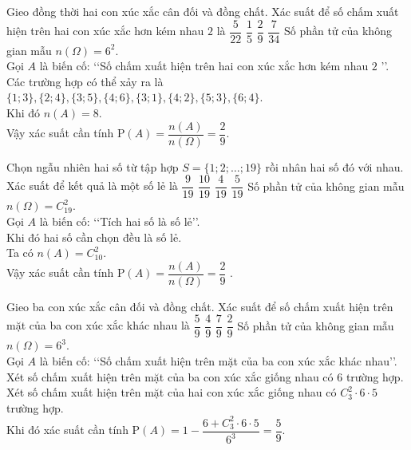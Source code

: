 \begin{ex}%
	Gieo đồng thời hai con xúc xắc cân đối và đồng chất. Xác suất để số chấm xuất hiện trên hai con xúc xắc hơn kém nhau $2$ là
	\choice
	{$\dfrac{5}{22}$}
	{$\dfrac{1}{5}$}
	{\True $\dfrac{2}{9}$}
	{$\dfrac{7}{34}$}
	\loigiai
	{
		Số phần tử của không gian mẫu $n(\Omega)=6^2$.\\
		Gọi  $A$ là biến cố: \lq\lq  Số chấm xuất hiện trên hai con xúc xắc hơn kém nhau $2$ \rq\rq.\\
		Các trường hợp có thể xảy ra là $\{1 ; 3\},\{2 ; 4\},\{3 ; 5\},\{4 ; 6\},\{3 ; 1\},\{4 ; 2\},\{5 ; 3\},\{6 ; 4\}$.\\
		Khi đó $n(A)=8$.\\
		Vậy xác suất cần tính $ \mathrm{P}(A)=\dfrac{n(A)}{n(\Omega)}=\dfrac{2}{9}$.		
	}	
\end{ex}
\begin{ex}%
	Chọn ngẫu nhiên hai số từ tập hợp $S=\{1 ; 2 ; \ldots ; 19\}$ rồi nhân hai số đó với nhau. Xác suất để kết quả là một số lẻ là
	\choice
	{$\dfrac{9}{19}$}
	{$\dfrac{10}{19}$}
	{$\dfrac{4}{19}$}
	{\True $\dfrac{5}{19}$}
	\loigiai
	{
		Số phần tử của không gian mẫu $n(\Omega)=C_{19}^{2}$.\\
		Gọi $A$ là biến cố: \lq\lq  Tích hai số là số lẻ\rq\rq.\\
		Khi đó hai số cần chọn đều là số lẻ.\\
		Ta có $n(A)=C_{10}^{2}$.\\
		Vậy xác suất cần tính $ \mathrm{P}(A)=\dfrac{n(A)}{n(\Omega)}=\dfrac{2}{9}$ 	.	
	}	
\end{ex}
\begin{ex}%
	Gieo ba con xúc xắc cân đối và đồng chất. Xác suất để số chấm xuất hiện trên mặt của ba con xúc xắc khác nhau là
	\choice
	{\True $\dfrac{5}{9}$}
	{$\dfrac{4}{9}$}
	{$\dfrac{7}{9}$}
	{$\dfrac{2}{9}$}
	\loigiai
	{
		Số phần tử của không gian mẫu $n(\Omega)=6^3$.\\
		Gọi  $A$ là biến cố: \lq\lq  Số chấm xuất hiện trên mặt của ba con xúc xắc khác nhau\rq\rq.\\
		Xét số chấm xuất hiện trên mặt của ba con xúc xắc giống nhau có $6$ trường hợp.\\
		Xét số chấm xuất hiện trên mặt của hai con xúc xắc giống nhau có $C_{3}^{2}\cdot 6\cdot 5$ trường hợp.\\
		Khi đó xác suất cần tính $ \mathrm{P}(A)=1-\dfrac{6+C_{3}^{2} \cdot 6 \cdot 5}{6^{3}}=\dfrac{5}{9}$. 		
	}	
\end{ex}
